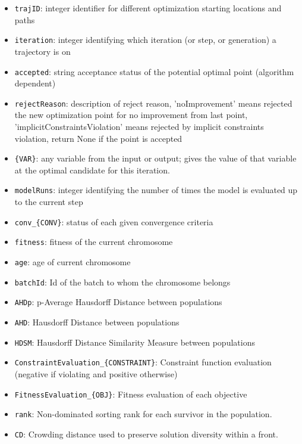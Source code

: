         \begin{itemize}
          \item \texttt{trajID}: integer identifier for different optimization starting locations and paths
             \item \texttt{iteration}: integer identifying which iteration (or step, or generation) a trajectory is on
             \item \texttt{accepted}: string acceptance status of the potential optimal point (algorithm dependent)
             \item \texttt{rejectReason}: description of reject reason, 'noImprovement' means rejected the new optimization point for no improvement from last point, 'implicitConstraintsViolation' means rejected by implicit constraints violation, return None if the point is accepted
             \item \texttt{\{VAR\}}: any variable from the  input or output; gives the value of that variable at the optimal candidate for this iteration.
             \item \texttt{modelRuns}: integer identifying the number of times the model is evaluated up to the current step
             \item \texttt{conv\_\{CONV\}}: status of each given convergence criteria
             \item \texttt{fitness}: fitness of the current chromosome
             \item \texttt{age}: age of current chromosome
             \item \texttt{batchId}: Id of the batch to whom the chromosome belongs
             \item \texttt{AHDp}: p-Average Hausdorff Distance between populations
             \item \texttt{AHD}: Hausdorff Distance between populations
             \item \texttt{HDSM}: Hausdorff Distance Similarity Measure between populations
             \item \texttt{ConstraintEvaluation\_\{CONSTRAINT\}}: Constraint function evaluation (negative if violating and positive otherwise)
             \item \texttt{FitnessEvaluation\_\{OBJ\}}: Fitness evaluation of each objective
             \item \texttt{rank}: Non-dominated sorting rank for each survivor in the population.
             \item \texttt{CD}: Crowding distance used to preserve solution diversity within a front.

         \end{itemize}

